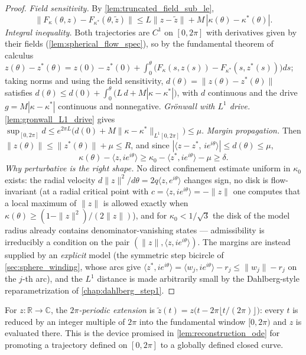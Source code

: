 \begin{proof}

\leanok
  \emph{Field sensitivity.} By \cref{lem:truncated_field_sub_le},
  \[
    \|F_{\kappa}(\theta,z)-F_{\kappa^\ast}(\theta,\tilde z)\|
    \le L\|z-\tilde z\|+M\,|\kappa(\theta)-\kappa^\ast(\theta)| .
  \]
  \emph{Integral inequality.} Both trajectories are $C^1$ on $[0,2\pi]$ with derivatives
  given by their fields (\cref{lem:spherical_flow_spec}), so by the fundamental theorem
  of calculus $z(\theta)-z^\ast(\theta)=z(0)-z^\ast(0)+\int_0^\theta\bigl(F_\kappa(s,
  z(s))-F_{\kappa^\ast}(s,z^\ast(s))\bigr)ds$; taking norms and using the field
  sensitivity, $d(\theta)=\|z(\theta)-z^\ast(\theta)\|$ satisfies
  $d(\theta)\le d(0)+\int_0^\theta\bigl(L\,d+M|\kappa-\kappa^\ast|\bigr)$, with $d$
  continuous and the drive $g=M|\kappa-\kappa^\ast|$ continuous and nonnegative.
  \emph{Gr\"onwall with $L^1$ drive.} \cref{lem:gronwall_L1_drive} gives
  $\sup_{[0,2\pi]}d\le e^{2\pi L}\bigl(d(0)+M\|\kappa-\kappa^\ast\|_{L^1[0,2\pi]}\bigr)
   \le\mu$.
  \emph{Margin propagation.} Then
  $\|z(\theta)\|\le\|z^\ast(\theta)\|+\mu\le R$, and since
  $|\langle z-z^\ast,\,i e^{i\theta}\rangle|\le d(\theta)\le\mu$,
  \[
    \kappa(\theta)-\langle z,i e^{i\theta}\rangle
    \ge\kappa_0-\langle z^\ast,i e^{i\theta}\rangle-\mu\ge\delta .
  \]
  \emph{Why perturbative is the right shape.} No direct confinement estimate uniform in
  $\kappa_0$ exists: the radial velocity $d\|z\|^2/d\theta=2q\langle z,e^{i\theta}\rangle$
  changes sign, no disk is flow-invariant (at a radial critical point with
  $c=\langle z,ie^{i\theta}\rangle=-\|z\|$ one computes that a local maximum of $\|z\|$ is
  allowed exactly when $\kappa(\theta)\ge(1-\|z\|^2)/(2\|z\|)$), and for
  $\kappa_0<1/\sqrt3$ the disk of the model radius already contains denominator-vanishing
  states — admissibility is irreducibly a condition on the pair
  $(\|z\|,\langle z,ie^{i\theta}\rangle)$. The margins are instead supplied by an
  \emph{explicit} model (the symmetric step bicircle of \cref{sec:sphere_winding}, whose
  arcs give $\langle z^\ast,ie^{i\theta}\rangle=\langle w_j,ie^{i\theta}\rangle-r_j
  \le\|w_j\|-r_j$ on the $j$-th arc), and the $L^1$ distance is made arbitrarily small by
  the Dahlberg-style reparametrization of \cref{chap:dahlberg_step1}.
\end{proof}

\begin{definition}
  \label{def:periodic_extension}
  For $z:\mathbb R\to\mathbb C$, the \emph{$2\pi$-periodic extension} is
  $\tilde z(t)=z\bigl(t-2\pi\lfloor t/(2\pi)\rfloor\bigr)$: every $t$ is reduced by an
  integer multiple of $2\pi$ into the fundamental window $[0,2\pi)$ and $z$ is evaluated
  there. This is the device promised in \cref{lem:reconstruction_ode} for promoting a
  trajectory defined on $[0,2\pi]$ to a globally defined closed curve.
\end{definition}

